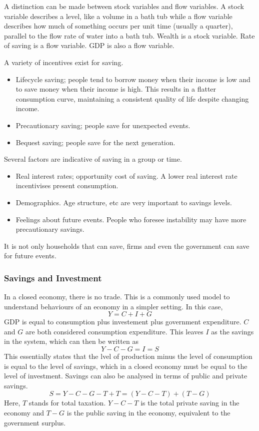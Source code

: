 \documentclass[12pt]{report}
\begin{document}
\begin{flushleft}
\bigskip
A distinction can be made between stock variables and flow variables. A stock
variable describes a level, like a volume in a bath tub while a flow variable
describes how much of something occurs per unit time (usually a quarter), 
parallel to the flow rate of water into a bath tub. Wealth is a stock variable.
Rate of saving is a flow variable. GDP is also a flow variable.

\bigskip
A variety of incentives exist for saving.
\begin{itemize}
    \item Lifecycle saving; people tend to borrow money when their income is
    low and to save money when their income is high. This results in a flatter
    consumption curve, maintaining a consistent quality of life despite 
    changing income.
    \item Precautionary saving; people save for unexpected events.
    \item Bequest saving; people save for the next generation.
\end{itemize}
Several factors are indicative of saving in a group or time.
\begin{itemize}
    \item Real interest rates; opportunity cost of saving. A lower real 
    interest rate incentivises present consumption.
    \item Demographics. Age structure, etc are very important to savings 
    levels.
    \item Feelings about future events. People who foresee instability may have
    more precautionary savings.
\end{itemize}

It is not only households that can save, firms and even the government can save
for future events.

\subsubsection*{Savings and Investment}

In a closed economy, there is no trade. This is a commonly used model to 
understand behaviours of an economy in a simpler setting. In this case,
\[Y = C + I + G\]
GDP is equal to consumption plus investement plus government expenditure. \(C\)
and \(G\) are both considered consumption expenditure. This leaves \(I\) as the
savings in the system, which can then be written as
\[Y - C - G = I = S\]
This essentially states that the lvel of production minus the level of
consumption is equal to the level of savings, which in a closed economy must be
equal to the level of investment. Savings can also be analysed in terms of 
public and private savings.
\[S = Y - C - G - T + T = (Y - C - T) + (T - G)\]
Here, \(T\) stands for total taxation. \(Y - C - T\) is the total private 
saving in the economy and \(T - G\) is the public saving in the economy, 
equivalent to the government surplus.


\end{flushleft}
\end{document}

